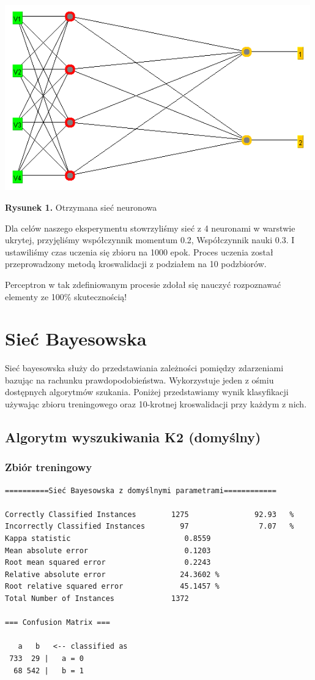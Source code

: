\documentclass{classrep}
\begin{document}
\begin{center}
	\includegraphics[height=8cm]{siec.png}
	
	
	\textbf{Rysunek 1.} Otrzymana sieć neuronowa
\end{center}

Dla celów naszego eksperymentu stowrzyliśmy sieć z 4 neuronami w warstwie ukrytej, przyjęliśmy współczynnik momentum 0.2, Współczynnik nauki 0.3. I ustawiliśmy czas uczenia się zbioru na 1000 epok. Proces uczenia został przeprowadzony metodą kroswalidacji z podziałem na 10 podzbiorów.

Perceptron w tak zdefiniowanym procesie zdołał się nauczyć rozpoznawać elementy ze 100\% skutecznością!

\section{Sieć Bayesowska}
Sieć bayesowska służy do przedstawiania zależności pomiędzy zdarzeniami bazując na rachunku prawdopodobieństwa. Wykorzystuje jeden z ośmiu dostępnych algorytmów szukania. Poniżej przedstawiamy wynik klasyfikacji używając zbioru treningowego oraz 10-krotnej kroswalidacji przy każdym z nich. 
\subsection{Algorytm wyszukiwania K2 (domyślny)}
\subsubsection*{Zbiór treningowy}
\scriptsize 
\begin{verbatim}
==========Sieć Bayesowska z domyślnymi parametrami============

Correctly Classified Instances        1275               92.93   %
Incorrectly Classified Instances        97                7.07   %
Kappa statistic                          0.8559
Mean absolute error                      0.1203
Root mean squared error                  0.2243
Relative absolute error                 24.3602 %
Root relative squared error             45.1457 %
Total Number of Instances             1372     

=== Confusion Matrix ===

   a   b   <-- classified as
 733  29 |   a = 0
  68 542 |   b = 1
\end{verbatim} 
\normalsize
\end{document}
